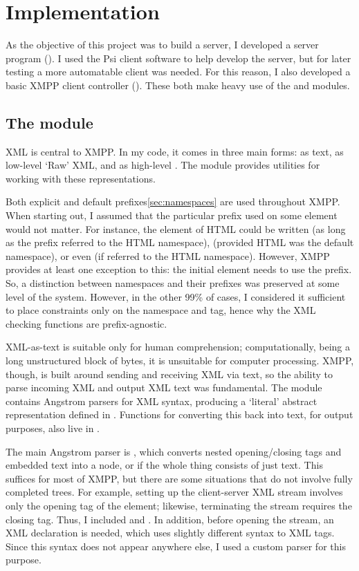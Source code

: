 \chapter{Implementation}
As the objective of this project was to build a server, I developed a server program (). I used the Psi client software to help develop the server, but for later testing a more automatable client was needed. For this reason, I also developed a basic XMPP client controller ().
These both make heavy use of the  and  modules.

\section{The  module}\label{sec:xmlmod}
XML is central to XMPP. In my code, it comes in three main forms: as text, as low-level `Raw' XML, and as high-level . The  module provides utilities for working with these representations.

Both explicit and default prefixes\ref{sec:namespaces} are used throughout XMPP. When starting out, I assumed that the particular prefix used on some element would not matter. For instance, the  element of HTML could be written  (as long as the  prefix referred to the HTML namespace),  (provided HTML was the default namespace), or even  (if  referred to the HTML namespace). However, XMPP provides at least one exception to this: the initial  element needs to use the  prefix. So, a distinction between namespaces and their prefixes was preserved at some level of the system. However, in the other 99\% of cases, I considered it sufficient to place constraints only on the namespace and tag, hence why the XML checking functions are prefix-agnostic.

XML-as-text is suitable only for human comprehension; computationally, being a long unstructured block of bytes, it is unsuitable for computer processing. XMPP, though, is built around sending and receiving XML via text, so the ability to parse incoming XML and output XML text was fundamental. The  module contains Angstrom parsers for XML syntax, producing a `literal' abstract representation defined in . Functions for converting this back into text, for output purposes, also live in .

The main Angstrom parser is , which converts nested opening/closing tags and embedded text into a  node, or  if the whole thing consists of just text. This suffices for most of XMPP, but there are some situations that do not involve fully completed trees. For example, setting up the client-server XML stream involves only the opening tag of the  element; likewise, terminating the stream requires the closing tag. Thus, I included  and . In addition, before opening the stream, an XML declaration  is needed, which uses slightly different syntax to XML tags. Since this syntax does not appear anywhere else, I used a custom parser for this purpose.

